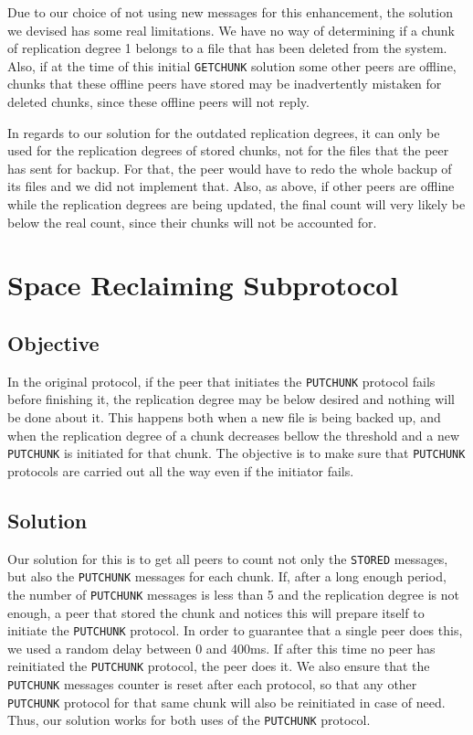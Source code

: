 \documentclass[11pt,a4paper,reqno]{report}
\numberwithin{equation}{section}
\begin{document}
Due to our choice of not using new messages for this enhancement, the solution we devised has some real limitations. We have no way of determining if a chunk of replication degree 1 belongs to a file that has been deleted from the system. Also, if at the time of this initial \verb!GETCHUNK! solution some other peers are offline, chunks that these offline peers have stored may be inadvertently mistaken for deleted chunks, since these offline peers will not reply.

In regards to our solution for the outdated replication degrees, it can only be used for the replication degrees of stored chunks, not for the files that the peer has sent for backup. For that, the peer would have to redo the whole backup of its files and we did not implement that. Also, as above, if other peers are offline while the replication degrees are being updated, the final count will very likely be below the real count, since their chunks will not be accounted for. 



\chapter{Space Reclaiming Subprotocol}

\section{Objective}

In the original protocol, if the peer that initiates the \verb!PUTCHUNK! protocol fails before finishing it, the replication degree may be below desired and nothing will be done about it. This happens both when a new file is being backed up, and when the replication degree of a chunk decreases bellow the threshold and a new \verb!PUTCHUNK! is initiated for that chunk. The objective is to make sure that \verb!PUTCHUNK! protocols are carried out all the way even if the initiator fails.

\section{Solution}

Our solution for this is to get all peers to count not only the \verb!STORED! messages, but also the \verb!PUTCHUNK! messages for each chunk. If, after a long enough period, the number of \verb!PUTCHUNK! messages is less than 5 and the replication degree is not enough, a peer that stored the chunk and notices this will prepare itself to initiate the \verb!PUTCHUNK! protocol. In order to guarantee that a single peer does this, we used a random delay between 0 and 400ms. If after this time no peer has reinitiated the \verb!PUTCHUNK! protocol, the peer does it. We also ensure that the \verb!PUTCHUNK! messages counter is reset after each protocol, so that any other \verb!PUTCHUNK! protocol for that same chunk will also be reinitiated in case of need. Thus, our solution works for both uses of the \verb!PUTCHUNK! protocol.
\end{document}
